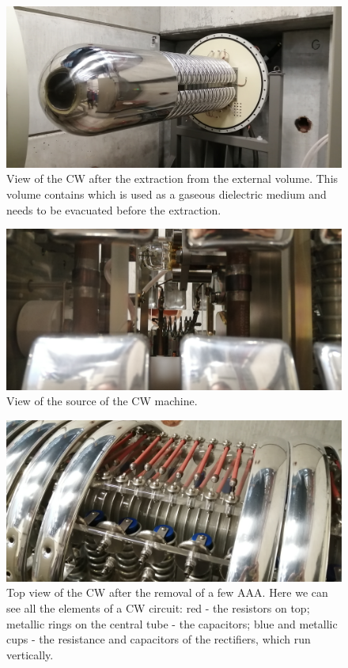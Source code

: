 \begin{refsection}
\begin{figure}
    \centering
    \includegraphics[width=1\textwidth]{Figures/MEG/CW/view_front.jpg}
    \caption{View of the CW after the extraction from the external volume. This volume contains  which is used as a gaseous dielectric medium and needs to be evacuated before the extraction.}
    \label{fig:CW:view}
\end{figure}

\begin{figure}
    \centering
    \includegraphics[width=1\textwidth]{Figures/MEG/CW/view_source.jpg}
    \caption{View of the source of the CW machine.}
    \label{fig:CW:view_source}
\end{figure}

\begin{figure}
    \centering
    \includegraphics[width=1\textwidth]{Figures/MEG/CW/view_top.jpg}
    \caption{Top view of the CW after the removal of a few AAA. Here we can see all the elements of a CW circuit: red - the resistors on top; metallic rings on the central tube - the capacitors; blue and metallic cups - the resistance and capacitors of the rectifiers, which run vertically.}
    \label{fig:CW:view_top}
\end{figure}


\end{refsection}
